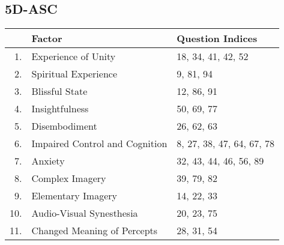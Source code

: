 \subsection*{\acf{5D-ASC}}
\begin{center}
\begin{tabular}{r @{ } l l}
    & \bfseries Factor & \bfseries Question Indices \\
    \hline
    1.  & Experience of Unity            & 18, 34, 41, 42, 52 \\
    2.  & Spiritual Experience           & 9, 81, 94 \\
    3.  & Blissful State                 & 12, 86, 91 \\
    4.  & Insightfulness                 & 50, 69, 77 \\
    5.  & Disembodiment                  & 26, 62, 63 \\
    6.  & Impaired Control and Cognition & 8, 27, 38, 47, 64, 67, 78 \\
    7.  & Anxiety                        & 32, 43, 44, 46, 56, 89 \\
    8.  & Complex Imagery                & 39, 79, 82 \\
    9.  & Elementary Imagery             & 14, 22, 33 \\
    10. & Audio-Visual Synesthesia       & 20, 23, 75 \\
    11. & Changed Meaning of Percepts    & 28, 31, 54 \\
\end{tabular}
\end{center}

